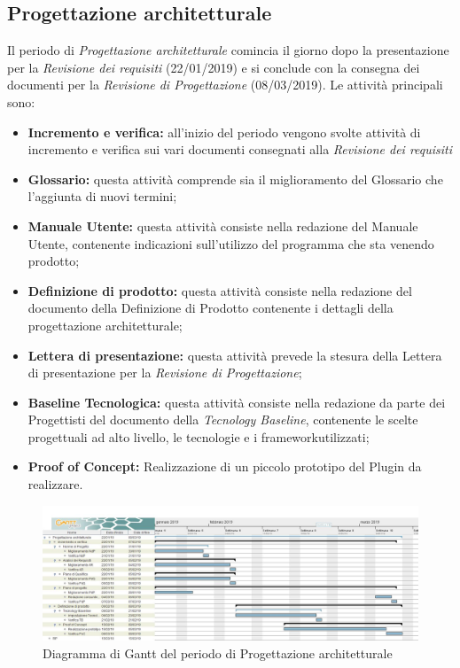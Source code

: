 \newpage
\subsection{Progettazione architetturale}
Il periodo di \textit{Progettazione architetturale} comincia il giorno dopo la presentazione per la \textit{Revisione dei requisiti} (22/01/2019) e si conclude con la consegna dei documenti per la \textit{Revisione di Progettazione} (08/03/2019). Le attività principali sono:
\begin{itemize}
	\item\textbf{Incremento e verifica:} all'inizio del periodo vengono svolte attività di incremento e verifica sui vari documenti consegnati alla \textit{Revisione dei requisiti}
	\item\textbf{Glossario:} questa attività comprende sia il miglioramento del Glossario che l’aggiunta di nuovi termini;
	\item\textbf{Manuale Utente:}  questa attività consiste nella redazione del Manuale Utente, contenente indicazioni sull’utilizzo del programma che sta venendo prodotto;
	\item\textbf{Definizione di prodotto:} questa attività consiste nella redazione del documento della Definizione di Prodotto contenente i dettagli della progettazione architetturale;
	\item\textbf{Lettera di presentazione:} questa attività prevede la stesura della Lettera di presentazione per la \textit{Revisione di Progettazione};
	\item\textbf{Baseline Tecnologica:} questa attività consiste nella redazione da parte dei Progettisti del documento della \textit{Tecnology Baseline}\pedice, contenente le scelte progettuali ad alto livello, le tecnologie e i framework\pedice utilizzati;
	\item \textbf{Proof of Concept:} Realizzazione di un piccolo prototipo del Plugin da realizzare.
\end{itemize}

\begin{figure}[!htpb]
	\centering
	\includegraphics[width=\textwidth]{Gantt_seconda_fase.jpg}
	\caption{Diagramma di Gantt del periodo di Progettazione architetturale}
\end{figure}

